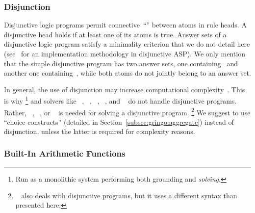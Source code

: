 \subsubsection{Disjunction}\label{subsec:gringo:disjunction}

Disjunctive logic programs permit connective~``\code{|}'' between atoms in rule heads.
A disjunctive head holds if at least one of its atoms is true.
Answer sets of a disjunctive logic program satisfy a minimality criterion
that we do not detail here
(see~\cite{eitpol06a} for an implementation methodology in disjunctive ASP).
We only mention that the simple disjunctive program  has two answer sets,
one containing~ and another one containing~,
while both atoms do not jointly belong to an answer set.

In general, the use of disjunction may %
increase
computational complexity~\cite{eitgot95a}.
This is why \clingo%
\footnote{Run as a monolithic system performing both grounding and \emph{solving}.}
and solvers like 
\assat~\cite{linzha04a},
\clasp~\cite{gekanesc07a},
\nomorepp~\cite{angelinesc05c},
\smodels~\cite{siniso02a}, and
\smodelscc~\cite{warsch04a}
do not %
handle disjunctive programs.
Rather,
\claspD~\cite{drgegrkakoossc08a},
\cmodels~\cite{gilima06a,lierler05a}, or
\gnt~\cite{janisesiyo06a}
is needed %
for solving a disjunctive program.%
\footnote{%
  \dlv~\cite{dlv03a} also deals with disjunctive programs,
  but it uses a different syntax than presented here.}
We %
suggest to use ``choice constructs'' (detailed in Section~\ref{subsec:gringo:aggregate})
instead of disjunction, unless the latter is required for complexity reasons.


\subsubsection{Built-In Arithmetic Functions}\label{subsec:gringo:arith}

